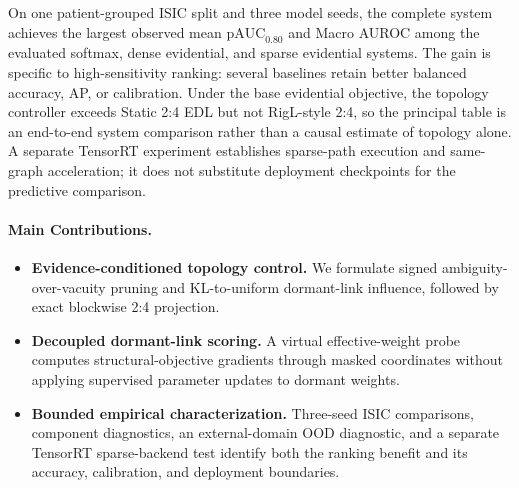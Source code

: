 \documentclass[letterpaper]{article}
\begin{document}
On one patient-grouped ISIC split and three model seeds, the complete system achieves the largest observed mean $\mathrm{pAUC}_{0.80}$ and Macro AUROC among the evaluated softmax, dense evidential, and sparse evidential systems. The gain is specific to high-sensitivity ranking: several baselines retain better balanced accuracy, AP, or calibration. Under the base evidential objective, the topology controller exceeds Static 2:4 EDL but not RigL-style 2:4, so the principal table is an end-to-end system comparison rather than a causal estimate of topology alone. A separate TensorRT experiment establishes sparse-path execution and same-graph acceleration; it does not substitute deployment checkpoints for the predictive comparison.

\paragraph{Main Contributions.}
\begin{itemize}
    \setlength{\itemsep}{0pt}
    \setlength{\parskip}{0pt}
    \setlength{\parsep}{0pt}
    \item \textbf{Evidence-conditioned topology control.} We formulate signed ambiguity-over-vacuity pruning and KL-to-uniform dormant-link influence, followed by exact blockwise 2:4 projection.
    \item \textbf{Decoupled dormant-link scoring.} A virtual effective-weight probe computes structural-objective gradients through masked coordinates without applying supervised parameter updates to dormant weights.
    \item \textbf{Bounded empirical characterization.} Three-seed ISIC comparisons, component diagnostics, an external-domain OOD diagnostic, and a separate TensorRT sparse-backend test identify both the ranking benefit and its accuracy, calibration, and deployment boundaries.
\end{itemize}
\end{document}
